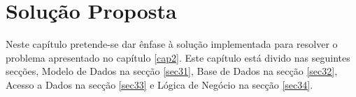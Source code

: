 %
%
\chapter{Solução Proposta} \label{cap3}

Neste capítulo pretende-se dar ênfase à solução implementada para resolver o problema apresentado no capítulo \ref{cap2}. Este capítulo está divido nas seguintes secções, Modelo de Dados na secção \ref{sec31}, Base de Dados na secção \ref{sec32}, Acesso a Dados na secção \ref{sec33} e Lógica de Negócio na secção \ref{sec34}.












